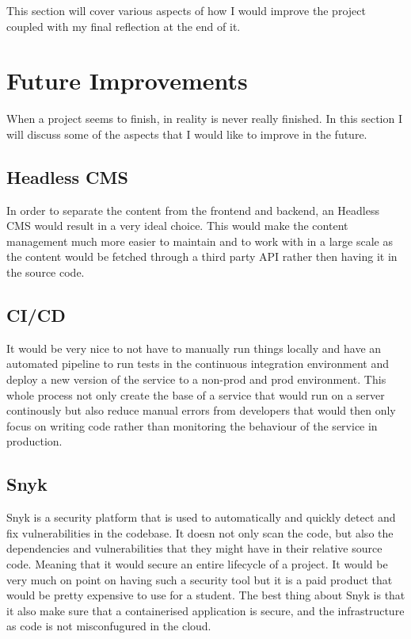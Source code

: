 This section will cover various aspects of how I would improve the project coupled
with my final reflection at the end of it.

\section{Future Improvements}
\label{s:Future-improvements}
When a project seems to finish, in reality is never really finished. In this
section I will discuss some of the aspects that I would like to improve in the
future.

\subsection{Headless CMS}
\label{s:Headless-CMS}
In order to separate the content from the frontend and backend, an Headless CMS
would result in a very ideal choice. This would make the content management much
more easier to maintain and to work with in a large scale as the content would be
fetched through a third party API rather then having it in the source code.

\subsection{CI/CD}
\label{s:CI-CD}
It would be very nice to not have to manually run things locally and have an
automated pipeline to run tests in the continuous integration environment and
deploy a new version of the service to a non-prod and prod environment. This
whole process not only create the base of a service that would run on a server
continously but also reduce manual errors from developers that would then only
focus on writing code rather than monitoring the behaviour of the service in
production.

\subsection{Snyk}
\label{s:Snyk}
Snyk is a security platform that is used to automatically and quickly detect and
fix vulnerabilities in the codebase. It doesn not only scan the code, but also
the dependencies and vulnerabilities that they might have in their relative
source code. Meaning that it would secure an entire lifecycle of a project. It
would be very much on point on having such a security tool but it is a paid
product that would be pretty expensive to use for a student. The best thing
about Snyk is that it also make sure that a containerised application is secure,
and the infrastructure as code is not misconfugured in the cloud.

